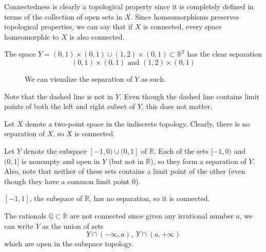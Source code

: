   Connectedness is clearly a topological property since it is completely defined in terms of the collection of open sets in $X$. Since homeomorphisms preserves topological properties, we can say that if $X$ is connected, every space homeomorphic to $X$ is also connected. 

  \begin{example}
    The space $Y = (0,1) \times (0,1) \cup (1,2) \times (0,1) \subset \mathbb{R}^2$ has the clear separation 
    \begin{equation}
      (0, 1) \times (0, 1) \text{ and } (1, 2) \times (0, 1)
    \end{equation}

    \begin{figure}[H]
      \centering 
      \caption{We can visualize the separation of $Y$ as such. } 
      \label{fig:separation_of_rectangle}
    \end{figure}
    Note that the dashed line is not in $Y$. Even though the dashed line contains limit points of both the left and right subset of $Y$, this does not matter. 
  \end{example}

  \begin{example}
    Let $X$ denote a two-point space in the indiscrete topology. Clearly, there is no separation of $X$, so $X$ is connected. 
  \end{example}

  \begin{example}
    Let $Y$ denote the subspace $[-1,0) \cup (0,1]$ of $\mathbb{R}$. Each of the sets $[-1,0)$ and $(0,1]$ is nonempty and open in $Y$ (but not in $\mathbb{R}$), so they form a separation of $Y$. Also, note that neither of these sets contains a limit point of the other (even though they have a common limit point $0$). 
  \end{example}

  \begin{example}
    $[-1,1]$, the subspace of $\mathbb{R}$, has no separation, so it is connected. 
  \end{example}

  \begin{example}
    The rationals $\mathbb{Q} \subset \mathbb{R}$ are not connected since given any irrational number $a$, we can write $Y$ as the union of sets
    \begin{equation}
      Y \cap (-\infty, a), \; Y \cap (a, +\infty)
    \end{equation}
    which are open in the subspace topology. 
  \end{example}

